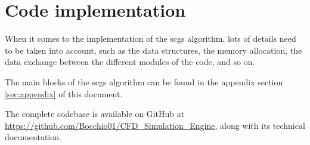 \section{Code implementation}
\label{sec:code_implementation}

When it comes to the implementation of the \acrshort{scgs} algorithm, lots of details need to be taken into account, such as the data structures, the memory allocation, the data exchange between the different modules of the code, and so on.


The main blocks of the \acrshort{scgs} algorithm can be found in the appendix section \ref{sec:appendix} of this document.

The complete codebase is available on GitHub at \url{https://github.com/Bocchio01/CFD_Simulation_Engine}, along with its technical documentation.




